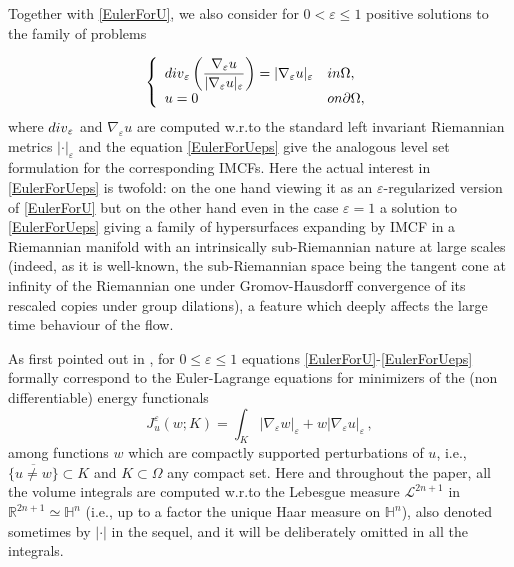 \documentclass[10pt]{amsart}
\numberwithin{equation}{section}
\theoremstyle{definition}
\newcommand{\He}{\mathbb{H}}
\begin{document}

Together with \eqref{EulerForU}, we also consider for $0<\varepsilon \leq 1$ positive solutions to the family of problems

\begin{equation}\label{EulerForUeps}
\left\{ \begin{array}{ll}
            {\rm div}_\varepsilon \left( \dfrac{\nabla_\varepsilon u}{|\nabla_\varepsilon u|_\varepsilon}\right) = |\nabla_\varepsilon u|_\varepsilon & \textrm{in } \Omega,\\
						u= 0 & \textrm{on } \partial \Omega, 
        \end{array}\right.
\end{equation}
where $\rm{div}_\varepsilon$ and $\nabla_\varepsilon u$ are computed w.r.to the standard left invariant Riemannian metrics $| \cdot |_\varepsilon$ and the equation \eqref{EulerForUeps} give the analogous level set formulation for the corresponding IMCFs. Here the actual interest in \eqref{EulerForUeps} is twofold: on the one hand viewing it as an $\varepsilon$-regularized version of \eqref{EulerForU} but on the other hand even in the case $\varepsilon=1$ a solution to \eqref{EulerForUeps} giving a family of hypersurfaces expanding by IMCF in a Riemannian manifold with an intrinsically sub-Riemannian nature at large scales (indeed, as it is well-known, the sub-Riemannian space being the tangent cone at infinity of the Riemannian one under Gromov-Hausdorff convergence of its rescaled copies under group dilations), a feature which deeply affects the large time behaviour of the flow.    


As first pointed out in \cite{HuiskenIlmanen},  for $0\leq \varepsilon \leq 1$ equations \eqref{EulerForU}-\eqref{EulerForUeps} formally correspond to the Euler-Lagrange equations for minimizers of the (non differentiable) energy functionals
\begin{equation}
\label{HI-energyeps}
J^\varepsilon_u(w;K)= \int_K |\nabla_\varepsilon w|_\varepsilon+w |\nabla_\varepsilon u|_\varepsilon \, ,
\end{equation}
among functions $w$ which are compactly supported perturbations of $u$,  i.e., $\overline{\{ u\neq w\}} \subset  K$ and $K \subset \Omega$ any compact set.  Here and throughout the paper, all the volume integrals are computed w.r.to the Lebesgue measure $\mathcal{L}^{2n+1}$ in $\mathbb{R}^{2n+1}\simeq \He^n$ (i.e., up to a factor the unique Haar measure on $\He^n$), also denoted sometimes by $|\cdot|$ in the sequel, and it will be deliberately omitted in all the integrals. 
\end{document}
